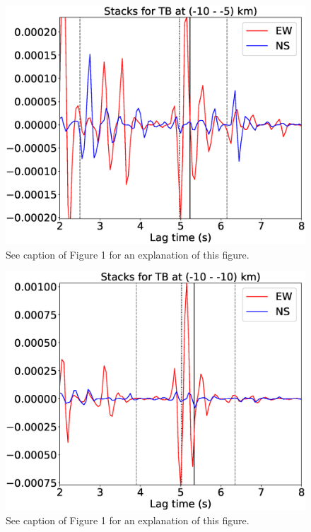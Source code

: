 \documentclass[letterpaper, 12pt]{article}
\begin{document}
\begin{figure}[H]
\includegraphics[width=\linewidth]{figures/intervals/TB_-10_-05_stacks.eps}
\caption{See caption of Figure 1 for an explanation of this figure.}
\end{figure}

\begin{figure}[H]
\includegraphics[width=\linewidth]{figures/intervals/TB_-10_-10_stacks.eps}
\caption{See caption of Figure 1 for an explanation of this figure.}
\end{figure}
\end{document}
